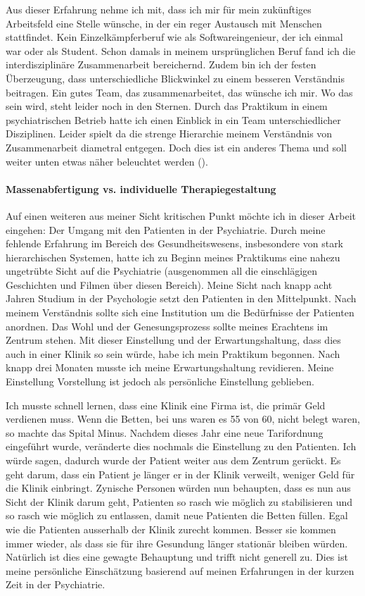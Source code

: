 Aus dieser Erfahrung nehme ich mit, dass ich mir für mein zukünftiges Arbeitsfeld eine Stelle wünsche, in der ein reger Austausch mit Menschen stattfindet. Kein Einzelkämpferberuf wie als Softwareingenieur, der ich einmal war oder als Student. Schon damals in meinem ursprünglichen Beruf fand ich die interdisziplinäre Zusammenarbeit bereichernd. Zudem bin ich der festen Überzeugung, dass unterschiedliche Blickwinkel zu einem besseren Verständnis beitragen. Ein gutes Team, das zusammenarbeitet, das wünsche ich mir. Wo das sein wird, steht leider noch in den Sternen. Durch das Praktikum in einem psychiatrischen Betrieb hatte ich einen Einblick in ein Team unterschiedlicher Disziplinen. Leider spielt da die strenge Hierarchie meinem Verständnis von Zusammenarbeit diametral entgegen. Doch dies ist ein anderes Thema und soll weiter unten etwas näher beleuchtet werden ().

\paragraph{Massenabfertigung vs. individuelle Therapiegestaltung}
Auf einen weiteren aus meiner Sicht kritischen Punkt möchte ich in dieser Arbeit eingehen: Der Umgang mit den Patienten in der Psychiatrie. Durch meine fehlende Erfahrung im Bereich des Gesundheitswesens, insbesondere von stark hierarchischen Systemen, hatte ich zu Beginn meines Praktikums eine nahezu ungetrübte Sicht auf die Psychiatrie (ausgenommen all die einschlägigen Geschichten und Filmen über diesen Bereich). Meine Sicht nach knapp acht Jahren Studium in der Psychologie setzt den Patienten in den Mittelpunkt. Nach meinem Verständnis sollte sich eine Institution um die Bedürfnisse der Patienten anordnen. Das Wohl und der Genesungsprozess sollte meines Erachtens im Zentrum stehen. Mit dieser Einstellung und der Erwartungshaltung, dass dies auch in einer Klinik so sein würde, habe ich mein Praktikum begonnen. Nach knapp drei Monaten musste ich meine Erwartungshaltung revidieren. Meine Einstellung Vorstellung ist jedoch als persönliche Einstellung geblieben. 

Ich musste schnell lernen, dass eine Klinik eine Firma ist, die primär Geld verdienen muss. Wenn die Betten, bei uns waren es 55 von 60, nicht belegt waren, so machte das Spital Minus. Nachdem dieses Jahr eine neue Tarifordnung eingeführt wurde, veränderte dies nochmals die Einstellung zu den Patienten. Ich würde sagen, dadurch wurde der Patient weiter aus dem Zentrum gerückt. Es geht darum, dass ein Patient je länger er in der Klinik verweilt, weniger Geld für die Klinik einbringt. Zynische Personen würden nun behaupten, dass es nun aus Sicht der Klinik darum geht, Patienten so rasch wie möglich zu stabilisieren und so rasch wie möglich zu entlassen, damit neue Patienten die Betten füllen. Egal wie die Patienten ausserhalb der Klinik zurecht kommen. Besser sie kommen immer wieder, als dass sie für ihre Gesundung länger stationär bleiben würden. Natürlich ist dies eine gewagte Behauptung und trifft nicht generell zu. Dies ist meine persönliche Einschätzung basierend auf meinen Erfahrungen in der kurzen Zeit in der Psychiatrie. 

